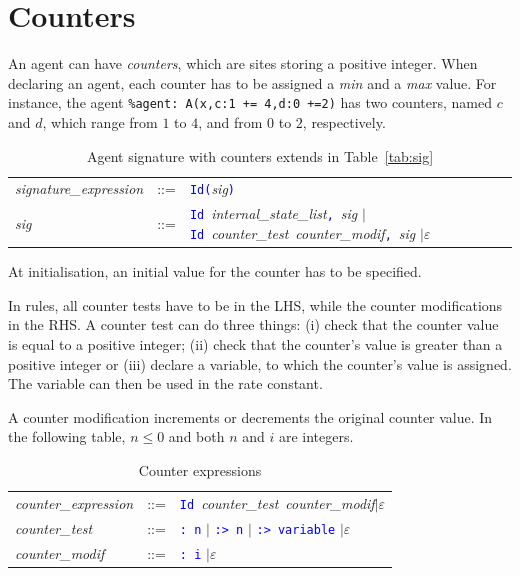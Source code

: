 \documentclass[11pt]{book}
\def\tcb#1{\textcolor{blue}{\ttt{#1}}}
\def\ttt#1{\texttt{#1}}
\begin{document}
\section{Counters}

An agent can have \emph{counters}, which are sites storing a positive integer. When declaring an agent, each counter has to be assigned a \emph{min} and a \emph{max} value.
For instance, the agent \ttt{\%agent: A(x,c:1 += 4,d:0 +=2)} has two counters, named $c$ and $d$, which range from $1$ to $4$, and from $0$ to $2$, respectively.

\begin{table}[htbp]
  \centering
  \caption{Agent signature with counters extends in Table~\ref{tab:sig}}
  \begin{tabular}{@{} lcl @{}}
    \textit{signature\_expression} & ::= &
    \tcb{Id}\tcb{(}\textit{sig}\tcb{)} \\

    \textit{sig} & ::= &
    \tcb{Id}~\textit{internal\_state\_list}\tcb{,}\ \textit{sig} $\mid$ \tcb{Id}~\textit{counter\_test}~\textit{counter\_modif}\tcb{,}\ \textit{sig}
    $\mid\varepsilon$ \\
 \end{tabular}
\end{table}

At initialisation, an initial value for the counter has to be specified.

In rules, all counter tests have to be in the LHS, while the counter modifications in the RHS.
A counter test can do three things: (i) check that the counter value is equal to a positive integer; (ii) check that the counter's value is greater than a positive integer or (iii) declare a variable, to which the counter's value is assigned. The variable can then be used in the rate constant.

A counter modification increments or decrements the original counter value. In the following table, $n\leq 0$ and both $n$ and $i$ are integers.
\begin{table}[ht!]
  \centering
  \caption{Counter expressions}
  \begin{tabular}{@{} lcl @{}}
    \textit{counter\_expression} & ::= & \tcb{Id}~\textit{counter\_test}~\textit{counter\_modif}$\mid\varepsilon$ \\
    \textit{counter\_test} & ::= & \tcb{: n} $\mid$ \tcb{:> n} $\mid$ \tcb{:> variable} $\mid\varepsilon$\\
    \textit{counter\_modif} & ::= & \tcb{: i} $\mid\varepsilon$\\
    \end{tabular}
\end{table}
\end{document}
